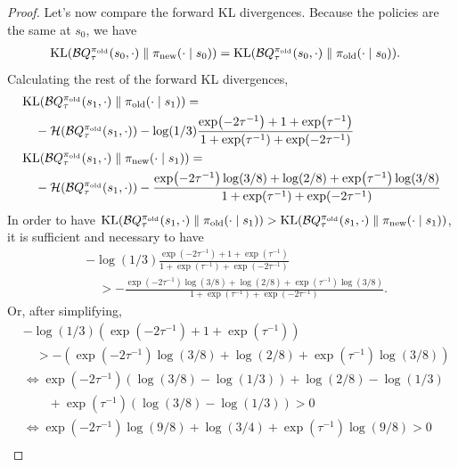 \documentclass[\main/thesis.tex]{subfiles}
\begin{document}
\begin{proof}
Let's now compare the forward KL divergences. Because the policies are the same at $s_0$, we have 
\begin{align*}
    \mathrm{KL}(\mathcal{B}Q_\tau^{\pi_\mathrm{old}}(s_0, \cdot) \parallel {\pi_\mathrm{new}}(\cdot \mid s_0)) &= \mathrm{KL}(\mathcal{B}Q_\tau^{\pi_\mathrm{old}}(s_0, \cdot) \parallel {\pi_\mathrm{old}}(\cdot \mid s_0)).
\end{align*}
Calculating the rest of the forward KL divergences,
\begin{align*}
    &\mathrm{KL}(\mathcal{B}Q_\tau^{\pi_\mathrm{old}}(s_1, \cdot) \parallel {\pi_\mathrm{old}}(\cdot \mid s_1)) =\\
    &\quad-\mathcal{H}(\mathcal{B}Q_\tau^{\pi_\mathrm{old}}(s_1, \cdot)) - \log(1/3) \frac{\exp(-2\tau^{-1}) + 1 + \exp(\tau^{-1})}{1 + \exp(\tau^{-1}) + \exp(-2\tau^{-1})}   \\
    &\mathrm{KL}(\mathcal{B}Q_\tau^{\pi_\mathrm{old}}(s_1, \cdot) \parallel {\pi_\mathrm{new}}(\cdot \mid s_1)) =\\
    &\quad-\mathcal{H}(\mathcal{B}Q_\tau^{\pi_\mathrm{old}}(s_1, \cdot)) - \frac{\exp(-2\tau^{-1}) \log(3/8)+ \log(2/8) + \exp(\tau^{-1}) \log(3/8)}{1 + \exp(\tau^{-1}) + \exp(-2\tau^{-1})}   
\end{align*}
In order to have $\mathrm{KL}(\mathcal{B}Q_\tau^{\pi_\mathrm{old}}(s_1, \cdot) \parallel {\pi_\mathrm{old}}(\cdot \mid s_1)) > \mathrm{KL}(\mathcal{B}Q_\tau^{\pi_\mathrm{old}}(s_1, \cdot) \parallel {\pi_\mathrm{new}}(\cdot \mid s_1))$, it is sufficient and necessary to have
\begin{align*}
    &- \log(1/3) \frac{\exp(-2\tau^{-1}) + 1 + \exp(\tau^{-1})}{1 + \exp(\tau^{-1}) + \exp(-2\tau^{-1})} \\
    &\quad > - \frac{\exp(-2\tau^{-1}) \log(3/8)+ \log(2/8) + \exp(\tau^{-1}) \log(3/8)}{1 + \exp(\tau^{-1}) + \exp(-2\tau^{-1})}.
\end{align*}
Or, after simplifying,
\begin{align*}
    &- \log(1/3) (\exp(-2\tau^{-1}) + 1 + \exp(\tau^{-1})) \\ 
    &\quad > - (\exp(-2\tau^{-1}) \log(3/8)+ \log(2/8) + \exp(\tau^{-1}) \log(3/8))\\
    &\iff \exp(-2\tau^{-1})(\log(3/8) - \log(1/3)) + \log(2/8) - \log(1/3)\\
    &\quad\quad+ \exp(\tau^{-1})(\log(3/8) - \log(1/3)) > 0\\
    &\iff \exp(-2\tau^{-1})\log(9/8) + \log(3/4) + \exp(\tau^{-1})\log(9/8) > 0\\

\end{align*}
\end{proof}
\end{document}
